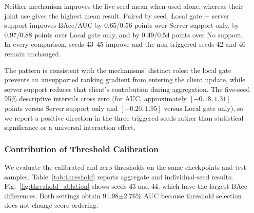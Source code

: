 \documentclass[lettersize,journal]{IEEEtran}
\begin{document}
Neither mechanism improves the five-seed mean when used alone, whereas their joint use gives the highest mean result. Paired by seed, Local gate + server support improves BAcc/AUC by 0.65/0.56 points over Server support only, by 0.97/0.88 points over Local gate only, and by 0.49/0.54 points over No support. In every comparison, seeds 43--45 improve and the non-triggered seeds 42 and 46 remain unchanged.

The pattern is consistent with the mechanisms' distinct roles: the local gate prevents an unsupported ranking gradient from entering the client update, while server support reduces that client's contribution during aggregation. The five-seed 95\% descriptive intervals cross zero (for AUC, approximately $[-0.18,1.31]$ points versus Server support only and $[-0.20,1.95]$ versus Local gate only), so we report a positive direction in the three triggered seeds rather than statistical significance or a universal interaction effect.

\subsubsection{Contribution of Threshold Calibration}
We evaluate the calibrated and zero thresholds on the same checkpoints and test samples. Table~\ref{tab:threshold} reports aggregate and individual-seed results; Fig.~\ref{fig:threshold_ablation} shows seeds 43 and 44, which have the largest BAcc differences. Both settings obtain 91.98$\pm$2.76\% AUC because threshold selection does not change score ordering.
\end{document}
